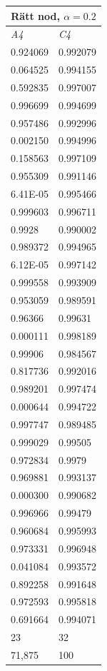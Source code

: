 \documentclass[a4paper,10pt]{article}
\begin{document}
\begin{centering}
{%
\begin{tabular}{| l | l| }
\hline
\multicolumn{2}{|c|}{Rätt nod, $\alpha=0.2$ }\\ \hline
\emph{A4} & \emph{C4} \\ \hline
0.924069  & 0.992079\\ \hline
0.064525  & 0.994155\\ \hline
0.592835  & 0.997007\\ \hline
0.996699  & 0.994699\\ \hline
0.957486  & 0.992996\\ \hline
0.002150  & 0.994996\\ \hline
0.158563  & 0.997109\\ \hline
0.955309  & 0.991146\\ \hline
6.41E-05  & 0.995466\\ \hline
0.999603  & 0.996711\\ \hline
0.9928    & 0.990002\\ \hline
0.989372  & 0.994965\\ \hline
6.12E-05  & 0.997142\\ \hline
0.999558  & 0.993909\\ \hline
0.953059  & 0.989591\\ \hline
0.96366   & 0.99631\\ \hline
0.000111  & 0.998189\\ \hline
0.99906   & 0.984567\\ \hline
0.817736  & 0.992016\\ \hline
0.989201  & 0.997474\\ \hline
0.000644  & 0.994722\\ \hline
0.997747  & 0.989485\\ \hline
0.999029  & 0.99505\\ \hline
0.972834  & 0.9979\\ \hline
0.969881  & 0.993137\\ \hline
0.000300  & 0.990682\\ \hline
0.996966  & 0.99479\\ \hline
0.960684  & 0.995993\\ \hline
0.973331  & 0.996948\\ \hline
0.041084  & 0.993572\\ \hline
0.892258  & 0.991648\\ \hline
0.972593  & 0.995818\\ \hline\hline
0.691664  & 0.994071\\ \hline
23 & 32\\ \hline
71,875 & 100 \\ \hline
\end{tabular}

}
\end{centering}
\end{document}
